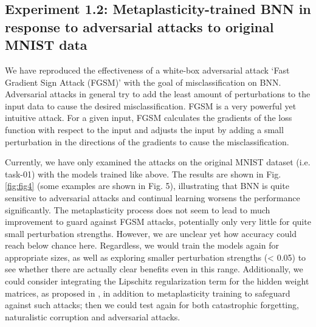 \documentclass[manuscript,screen,review]{acmart}
\begin{document}
\subsection{Experiment 1.2: Metaplasticity-trained BNN in response to adversarial attacks to original MNIST data}

We have reproduced the effectiveness of a white-box adversarial attack ‘Fast Gradient Sign Attack (FGSM)’ with the goal of misclassification on BNN. Adversarial attacks in general try to add the least amount of perturbations to the input data to cause the desired misclassification. FGSM is a very powerful yet intuitive attack. For a given input, FGSM calculates the gradients of the loss function with respect to the input and adjusts the input by adding a small perturbation in the directions of the gradients to cause the misclassification. 

Currently, we have only examined the attacks on the original MNIST dataset (i.e. task-01) with the models trained like above. The results are shown in Fig. \ref{fig:fig4} (some examples are shown in Fig. 5), illustrating that BNN is quite sensitive to adversarial attacks and continual learning worsens the performance significantly. The metaplasticity process does not seem to lead to much improvement to guard against FGSM attacks, potentially only very little for quite small perturbation strengths. However, we are unclear yet how accuracy could reach below chance here. Regardless, we would train the models again for appropriate sizes, as well as exploring smaller perturbation strengths (< 0.05) to see whether there are actually clear benefits even in this range. Additionally, we could consider integrating the Lipschitz regularization term for the hidden weight matrices, as proposed in \cite{Lin_2019}, in addition to metaplasticity training to safeguard against such attacks; then we could test again for both catastrophic forgetting, naturalistic corruption and adversarial attacks. 
\end{document}
